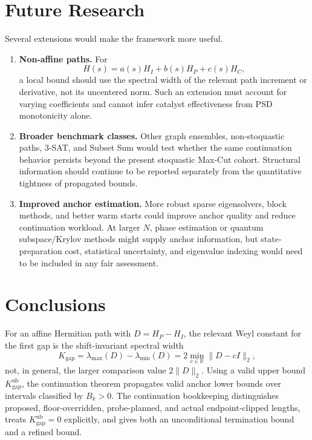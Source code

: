 \documentclass[11pt, a4paper]{article}
\newcommand{\norm}[1]{\| #1 \|}
\begin{document}
\section{Future Research}

Several extensions would make the framework more useful.
\begin{enumerate}
    \item \textbf{Non-affine paths.} For
    \begin{equation}
    H(s)=a(s)H_I+b(s)H_P+c(s)H_C,
    \end{equation}
    a local bound should use the spectral width of the relevant path increment or derivative, not its uncentered norm. Such an extension must account for varying coefficients and cannot infer catalyst effectiveness from PSD monotonicity alone.

    \item \textbf{Broader benchmark classes.} Other graph ensembles, non-stoquastic paths, 3-SAT, and Subset Sum would test whether the same continuation behavior persists beyond the present stoquastic Max-Cut cohort. Structural information should continue to be reported separately from the quantitative tightness of propagated bounds.

    \item \textbf{Improved anchor estimation.} More robust sparse eigensolvers, block methods, and better warm starts could improve anchor quality and reduce continuation workload. At larger $N$, phase estimation or quantum subspace/Krylov methods \cite{Parrish2019, Stair2020} might supply anchor information, but state-preparation cost, statistical uncertainty, and eigenvalue indexing would need to be included in any fair assessment.
\end{enumerate}

\section{Conclusions}

For an affine Hermitian path with $D=H_P-H_I$, the relevant Weyl constant for the first gap is the shift-invariant spectral width
\begin{equation}
K_{\mathrm{gap}}=\lambda_{\max}(D)-\lambda_{\min}(D)
=2\min_{c\in\mathbb R}\norm{D-cI}_2,
\end{equation}
not, in general, the larger comparison value $2\norm{D}_2$. Using a valid upper bound $K_{\mathrm{gap}}^{\mathrm{ub}}$, the continuation theorem propagates valid anchor lower bounds over intervals classified by $B_k>0$. The continuation bookkeeping distinguishes proposed, floor-overridden, probe-planned, and actual endpoint-clipped lengths, treats $K_{\mathrm{gap}}^{\mathrm{ub}}=0$ explicitly, and gives both an unconditional termination bound and a refined bound.
\end{document}

